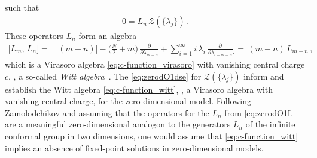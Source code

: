 such that
\begin{align}
	0 = L_n \, \mathcal{Z} ( \{\lambda_j\} ) \, .\label{eq:zerodO1dse}
\end{align}
These operators $L_n$ form an algebra
\begin{align}
	\big[ L_m, \, L_n \big] = \, & ( m - n ) \bigg[ - \big( \tfrac{N}{2} + m \big) \, \frac{\partial}{\partial \lambda_{m + n}} +  \sum_{i = 1}^{\infty} i \, \lambda_i \, \frac{\partial}{\partial \lambda_{i + m + n}} \bigg] = \, ( m - n ) \, L_{m + n} \, ,\label{eq:c-function_witt}
\end{align}
which is a Virasoro algebra \eqref{eq:c-function_virasoro} with vanishing central charge $c$, \ie{}, a so-called \textit{Witt algebra}~\cite{Witt1937Jan}.
The \dses{} \eqref{eq:zerodO1dse} for $\mathcal{Z} ( \{\lambda_j\} )$ inform and establish the Witt algebra \eqref{eq:c-function_witt}, \ie{}, a Virasoro algebra with vanishing central charge, for the zero-dimensional \ON{} model.
Following Zamolodchikov and assuming that the operators for the \dses{} $L_n$ from \cref{eq:zerodO1L} are a meaningful zero-dimensional analogon to the generators $L_n$ of the infinite conformal group in two dimensions, one would assume that \cref{eq:c-function_witt} implies an absence of fixed-point solutions in zero-dimensional \ON{} models.

